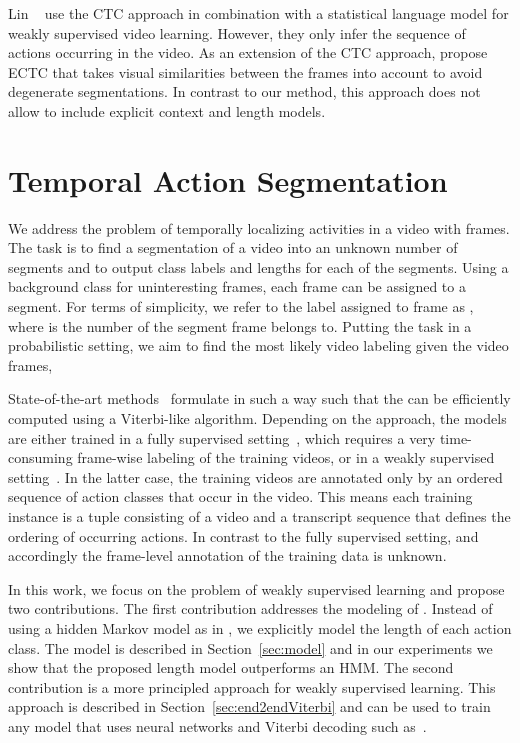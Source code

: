 \documentclass[10pt,twocolumn,letterpaper]{article}
\begin{document}
Lin \etal~\cite{lin2017ctc} use the CTC approach in combination with a statistical language model
for weakly supervised video learning. However, they only infer the sequence of actions occurring in the video.
As an extension of the CTC approach, \cite{huang2016connectionist} propose ECTC
that takes visual similarities between the frames into account to avoid degenerate
segmentations. In contrast to our method, this approach does not allow to include explicit context
and length models.

\section{Temporal Action Segmentation}

We address the problem of temporally localizing activities in a video  with  frames.  
The task is to find a segmentation of a video  into an unknown number of  segments and to
output class labels  and lengths 
for each of the  segments. Using a background class for uninteresting frames, each frame
can be assigned to a segment.
For terms of simplicity, we refer to the label assigned to frame  as , where
 is the number of the segment frame  belongs to.
Putting the task in a probabilistic setting, we aim to find the most likely video
labeling given the video frames, \ie


State-of-the-art methods~\cite{vo2014stochastic,richard2016temporal,kuehne2017weakly,koller2016deephand,richard2017weakly,koller2017resign} formulate  in such a way such that the  can be efficiently computed using a Viterbi-like algorithm. Depending on the approach, the models are either trained in a fully supervised setting~\cite{vo2014stochastic,richard2016temporal}, which requires a very time-consuming frame-wise labeling of the training videos, or in a weakly supervised setting~\cite{kuehne2017weakly,koller2016deephand,richard2017weakly,koller2017resign}. In the latter case, the training videos are annotated only by an ordered sequence of action classes that occur in the video. This means each training instance is a tuple  consisting of a video  and a transcript sequence  that defines the ordering
of occurring actions. In contrast to the fully supervised setting,  and accordingly the frame-level annotation of the training data is unknown.

In this work, we focus on the problem of weakly supervised learning and propose two contributions. The first contribution addresses the modeling of . Instead of using a hidden Markov model as in \cite{kuehne2017weakly,koller2016deephand,richard2017weakly,koller2017resign}, we explicitly model the length of each action class. The model is described in Section~\ref{sec:model} and in our experiments we show that the proposed length model outperforms an HMM. The second contribution is a more principled approach for weakly supervised learning. This approach is described in Section~\ref{sec:end2endViterbi} and can be used to train any model that uses neural networks and Viterbi decoding such as~\cite{koller2016deephand,richard2017weakly,koller2017resign}.
\end{document}
